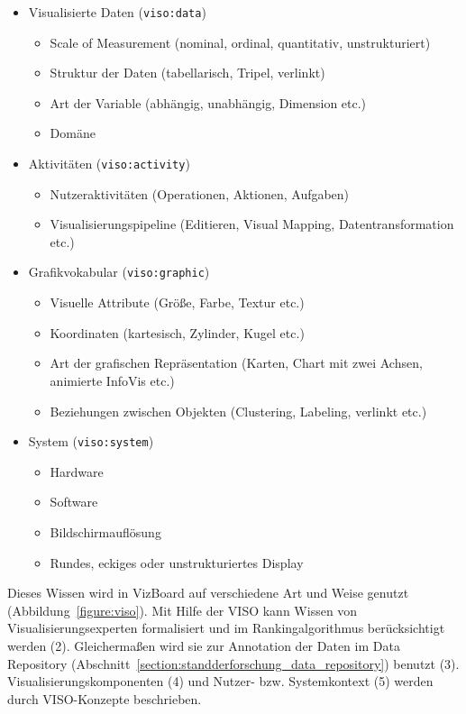 \documentclass[
	headsepline,
	footsepline,
	fontsize=12pt,
	bibliography=totoc
]{scrbook}
\begin{document}
\begin{itemize}
	\item Visualisierte Daten (\texttt{viso:data})
	\begin{itemize}
		\item Scale of Measurement (nominal, ordinal, quantitativ, unstrukturiert)
		\item Struktur der Daten (tabellarisch, Tripel, verlinkt)
		\item Art der Variable (abhängig, unabhängig, Dimension etc.)
		\item Domäne
	\end{itemize}
	\item Aktivitäten (\texttt{viso:activity})
	\begin{itemize}
		\item Nutzeraktivitäten (Operationen, Aktionen, Aufgaben)
		\item Visualisierungspipeline (Editieren, Visual Mapping, Datentransformation etc.)
	\end{itemize}
	\item Grafikvokabular (\texttt{viso:graphic})
	\begin{itemize}
		\item Visuelle Attribute (Größe, Farbe, Textur etc.)
		\item Koordinaten (kartesisch, Zylinder, Kugel etc.)
		\item Art der grafischen Repräsentation (Karten, Chart mit zwei Achsen, animierte InfoVis etc.)
		\item Beziehungen zwischen Objekten (Clustering, Labeling, verlinkt etc.)
	\end{itemize}
	\item System (\texttt{viso:system})
	\begin{itemize}
		\item Hardware
		\item Software
		\item Bildschirmauflösung
		\item Rundes, eckiges oder unstrukturiertes Display
	\end{itemize}
\end{itemize}

Dieses Wissen wird in VizBoard auf verschiedene Art und Weise genutzt (Abbildung~\ref{figure:viso}). Mit Hilfe der VISO kann Wissen von Visualisierungsexperten formalisiert und im Rankingalgorithmus berücksichtigt werden (2). Gleichermaßen wird sie zur Annotation der Daten im Data Repository (Abschnitt~\ref{section:standderforschung_data_repository}) benutzt (3). Visualisierungskomponenten (4) und Nutzer- bzw. Systemkontext (5) werden durch VISO-Konzepte beschrieben.
\end{document}
